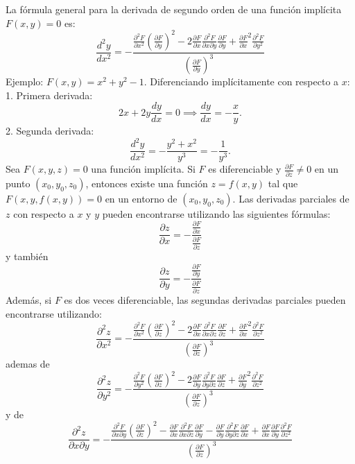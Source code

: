 \documentclass[11pt]{book}
\theoremstyle{definicion}
\theoremstyle{teorema}
\theoremstyle{ejemplo}
\begin{document}
\noindent
La fórmula general para la derivada de segundo orden de una función implícita \( F(x, y) = 0 \) es:
\[
\frac{d^2y}{dx^2} = -\frac{\frac{\partial^2 F}{\partial x^2} \left( \frac{\partial F}{\partial y} \right)^2 - 2 \frac{\partial F}{\partial x} \frac{\partial^2 F}{\partial x \partial y} \frac{\partial F}{\partial y} + \frac{\partial F}{\partial x}^2 \frac{\partial^2 F}{\partial y^2}}{\left( \frac{\partial F}{\partial y} \right)^3}
\]
Ejemplo: $F(x,y)=x^2+y^2-1$.
Diferenciando implícitamente con respecto a \( x \):
1. Primera derivada:
\[
2x + 2y \frac{dy}{dx} = 0 \implies \frac{dy}{dx} = -\frac{x}{y}.
\]
2. Segunda derivada:
\[
\frac{d^2y}{dx^2} = -\frac{y^2 + x^2}{y^3} = -\frac{1}{y^3}.
\]
Sea \( F(x, y, z) = 0 \) una función implícita. Si \( F \) es diferenciable y \( \frac{\partial F}{\partial z} \neq 0 \) en un punto \( (x_0, y_0, z_0) \), entonces existe una función \( z = f(x, y) \) tal que \( F(x, y, f(x, y)) = 0 \) en un entorno de \( (x_0, y_0, z_0) \). Las derivadas parciales de \( z \) con respecto a \( x \) y \( y \) pueden encontrarse utilizando las siguientes fórmulas:
\[
\frac{\partial z}{\partial x} = -\frac{\frac{\partial F}{\partial x}}{\frac{\partial F}{\partial z}}
\]
y también
\[
\frac{\partial z}{\partial y} = -\frac{\frac{\partial F}{\partial y}}{\frac{\partial F}{\partial z}}
\]
Además, si \( F \) es dos veces diferenciable, las segundas derivadas parciales pueden encontrarse utilizando:
\[
\frac{\partial^2 z}{\partial x^2} = -\frac{\frac{\partial^2 F}{\partial x^2} \left( \frac{\partial F}{\partial z} \right)^2 - 2 \frac{\partial F}{\partial x} \frac{\partial^2 F}{\partial x \partial z} \frac{\partial F}{\partial z} + \frac{\partial F}{\partial x}^2 \frac{\partial^2 F}{\partial z^2}}{\left( \frac{\partial F}{\partial z} \right)^3}
\]
ademas de 
\[
\frac{\partial^2 z}{\partial y^2} = -\frac{\frac{\partial^2 F}{\partial y^2} \left( \frac{\partial F}{\partial z} \right)^2 - 2 \frac{\partial F}{\partial y} \frac{\partial^2 F}{\partial y \partial z} \frac{\partial F}{\partial z} + \frac{\partial F}{\partial y}^2 \frac{\partial^2 F}{\partial z^2}}{\left( \frac{\partial F}{\partial z} \right)^3}
\]
y de
\[
\frac{\partial^2 z}{\partial x \partial y} = -\frac{\frac{\partial^2 F}{\partial x \partial y} \left( \frac{\partial F}{\partial z} \right)^2 - \frac{\partial F}{\partial x} \frac{\partial^2 F}{\partial x \partial z} \frac{\partial F}{\partial y} - \frac{\partial F}{\partial y} \frac{\partial^2 F}{\partial y \partial z} \frac{\partial F}{\partial x} + \frac{\partial F}{\partial x} \frac{\partial F}{\partial y} \frac{\partial^2 F}{\partial z^2}}{\left( \frac{\partial F}{\partial z} \right)^3}
\]
\end{document}
